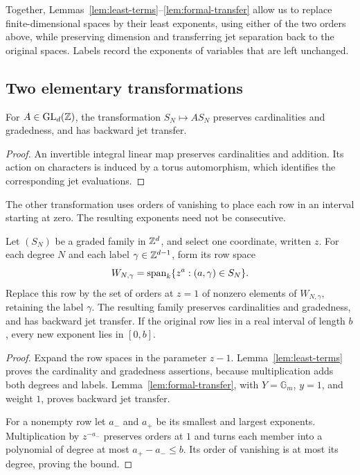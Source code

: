 Together, Lemmas~\ref{lem:least-terms}--\ref{lem:formal-transfer} allow
us to replace finite-dimensional spaces by their least exponents, using
either of the two orders above, while preserving dimension and
transferring jet separation back to the original spaces.  Labels record
the exponents of variables that are left unchanged.

\subsection{Two elementary transformations}

\begin{lemma}\label{lem:unimodular}
For $A\in\operatorname{GL}_d(\mathbb Z)$, the transformation
$S_N\mapsto A S_N$ preserves cardinalities and gradedness, and has
backward jet transfer.
\end{lemma}

\begin{proof}
An invertible integral linear map preserves cardinalities and addition.
Its action on characters is induced by a torus automorphism, which
identifies the corresponding jet evaluations.
\end{proof}

The other transformation uses orders of vanishing to place each row in an
interval starting at zero.  The resulting exponents need not be consecutive.

\begin{lemma}\label{lem:compression}
Let $(S_N)$ be a graded family in $\mathbb Z^d$, and select one coordinate,
written $z$.  For each degree $N$ and each label $\gamma\in\mathbb Z^{d-1}$,
form its row space
\[
 W_{N,\gamma}
 =\operatorname{span}_k\{z^a:(a,\gamma)\in S_N\}.
\]
Replace this row by the set of orders at $z=1$ of nonzero elements of
$W_{N,\gamma}$, retaining the label $\gamma$.  The resulting family
preserves cardinalities and gradedness, and has backward jet transfer.
If the original row lies in a real interval of length $b$, every new
exponent lies in $[0,b]$.
\end{lemma}

\begin{proof}
Expand the row spaces in the parameter $z-1$.  Lemma~\ref{lem:least-terms}
proves the cardinality and gradedness assertions, because multiplication
adds both degrees and labels.  Lemma~\ref{lem:formal-transfer}, with
$Y=\mathbb G_m$, $y=1$, and weight $1$, proves backward jet transfer.

For a nonempty row let $a_-$ and $a_+$ be its smallest and largest
exponents.  Multiplication by $z^{-a_-}$ preserves orders at $1$ and
turns each member into a polynomial of degree at most $a_+-a_-\leq b$.
Its order of vanishing is at most its degree, proving the bound.
\end{proof}

